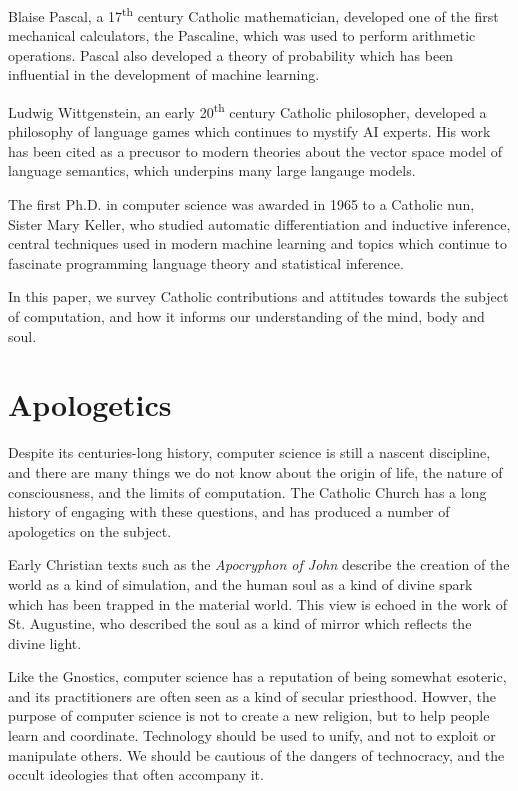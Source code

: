 \documentclass[sigplan,nonacm]{acmart}\settopmatter{printfolios=false,printccs=false,printacmref=false}
\begin{document}
  Blaise Pascal, a 17\textsuperscript{th} century Catholic mathematician, developed one of the first mechanical calculators, the Pascaline, which was used to perform arithmetic operations. Pascal also developed a theory of probability which has been influential in the development of machine learning.

  Ludwig Wittgenstein, an early 20\textsuperscript{th} century Catholic philosopher, developed a philosophy of language games which continues to mystify AI experts. His work has been cited as a precusor to modern theories about the vector space model of language semantics, which underpins many large langauge models.

  The first Ph.D. in computer science was awarded in 1965 to a Catholic nun, Sister Mary Keller, who studied automatic differentiation and inductive inference, central techniques used in modern machine learning and topics which continue to fascinate programming language theory and statistical inference.

  In this paper, we survey Catholic contributions and attitudes towards the subject of computation, and how it informs our understanding of the mind, body and soul.

 \section{Apologetics}

  Despite its centuries-long history, computer science is still a nascent discipline, and there are many things we do not know about the origin of life, the nature of consciousness, and the limits of computation. The Catholic Church has a long history of engaging with these questions, and has produced a number of apologetics on the subject.

  Early Christian texts such as the \textit{Apocryphon of John} describe the creation of the world as a kind of simulation, and the human soul as a kind of divine spark which has been trapped in the material world. This view is echoed in the work of St. Augustine, who described the soul as a kind of mirror which reflects the divine light.

  Like the Gnostics, computer science has a reputation of being somewhat esoteric, and its practitioners are often seen as a kind of secular priesthood. Howver, the purpose of computer science is not to create a new religion, but to help people learn and coordinate. Technology should be used to unify, and not to exploit or manipulate others. We should be cautious of the dangers of technocracy, and the occult ideologies that often accompany it.
\end{document}
